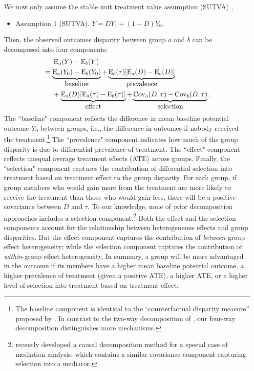 \documentclass[12pt,a4paper]{article}
\newcommand{\Cov}{\operatorname{Cov}}
\newcommand{\E}{\operatorname{E}}
\begin{document}
We now only assume the stable unit treatment value assumption (SUTVA) \citep{rubin_randomization_1980}, 
\begin{itemize}
     \item[] Assumption 1 (SUTVA). $Y=D Y_1 + (1-D) Y_0$.
\end{itemize}
Then, the observed outcomes disparity between group $a$ and $b$ can be decomposed into four components: 
\begin{align}
&\phantom{{}={}} \E_a(Y)-\E_b(Y)   \nonumber  \\
&= \underbrace{ \E_a(Y_{0})-\E_b(Y_{0}) }_{\text{\normalsize baseline}}
+ \underbrace{\E_b(\tau) [\E_a(D)-\E_b(D)]}_{\text{\normalsize prevalence}} \nonumber  \\ 
&\phantom{{}={}} + \underbrace{\E_a(D)[ \E_a(\tau) - \E_b(\tau) ]}_{\text{\normalsize effect}} 
+ \underbrace{\Cov_a(D, \tau) -  \Cov_b(D, \tau)}_{\text{\normalsize  selection}}. \label{eqt1}
\end{align}
The ``baseline" component reflects the difference in mean baseline potential outcome $Y_0$ between groups, i.e., the difference in outcomes if nobody received the treatment.\footnote{The baseline component is identical to the ``counterfactual disparity measure'' proposed by \citet{naimi_mediation_2016}. In contrast to the two-way decomposition of \citet{naimi_mediation_2016}, our four-way decomposition distinguishes more mechanisms.} The ``prevalence" component indicates how much of the group disparity is due to differential prevalence of treatment. The ``effect" component reflects unequal average treatment effects (ATE) across groups. Finally, the ``selection" component captures the contribution of differential selection into treatment based on treatment effect to the group disparity. 
For each group, if group members who would gain more from the treatment are more likely to receive the treatment than those who would gain less, there will be a positive covariance between $D$ and $\tau$. To our knowledge, none of prior decomposition approaches includes a selection component.\footnote{\citet{zhou_attendance_2022} recently developed a causal decomposition method for a special case of mediation analysis, which contains a similar covariance component capturing selection into a mediator.} 
Both the effect and the selection components account for the relationship between heterogeneous effects and group disparities. But the effect component captures the contribution of \emph{between}-group effect heterogeneity; while the selection component captures the contribution of \emph{within}-group effect heterogeneity. In summary, a group will be more advantaged in the outcome if its members have a higher mean baseline potential outcome, a higher prevalence of treatment (given a positive ATE), a higher ATE, or a higher level of selection into treatment based on treatment effect.
\end{document}
